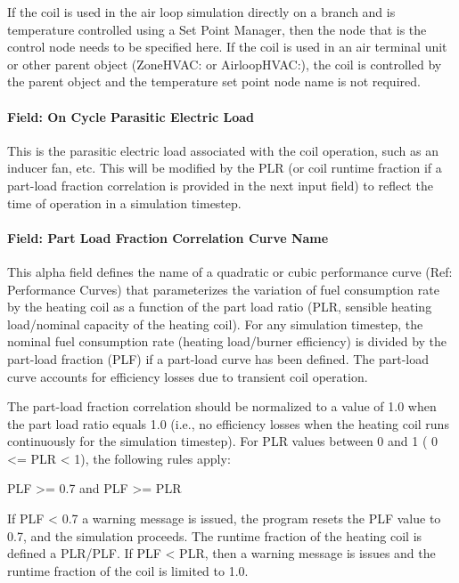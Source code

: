 If the coil is used in the air loop simulation directly on a branch and is temperature controlled using a Set Point Manager, then the node that is the control node needs to be specified here. If the coil is used in an air terminal unit or other parent object (ZoneHVAC: or AirloopHVAC:), the coil is controlled by the parent object and the temperature set point node name is not required.

\paragraph{Field: On Cycle Parasitic Electric Load}\label{field-parasitic-electric-load-1}

This is the parasitic electric load associated with the coil operation, such as an inducer fan, etc. This will be modified by the PLR (or coil runtime fraction if a part-load fraction correlation is provided in the next input field) to reflect the time of operation in a simulation timestep.

\paragraph{Field: Part Load Fraction Correlation Curve Name}\label{field-part-load-fraction-correlation-curve-name}

This alpha field defines the name of a quadratic or cubic performance curve (Ref: Performance Curves) that parameterizes the variation of fuel consumption rate by the heating coil as a function of the part load ratio (PLR, sensible heating load/nominal capacity of the heating coil). For any simulation timestep, the nominal fuel consumption rate (heating load/burner efficiency) is divided by the part-load fraction (PLF) if a part-load curve has been defined. The part-load curve accounts for efficiency losses due to transient coil operation.

The part-load fraction correlation should be normalized to a value of 1.0 when the part load ratio equals 1.0 (i.e., no efficiency losses when the heating coil runs continuously for the simulation timestep). For PLR values between 0 and 1 ( 0 \textless{}= PLR \textless{} 1), the following rules apply:

PLF \textgreater{}= 0.7 and PLF \textgreater{}= PLR

If PLF \textless{} 0.7 a warning message is issued, the program resets the PLF value to 0.7, and the simulation proceeds. The runtime fraction of the heating coil is defined a PLR/PLF. If PLF \textless{} PLR, then a warning message is issues and the runtime fraction of the coil is limited to 1.0.

